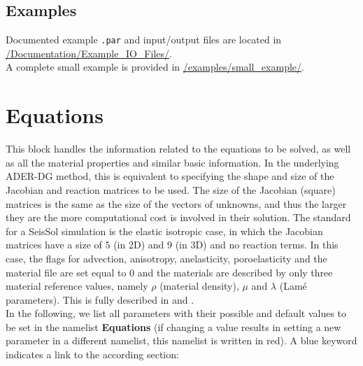 \documentclass[12pt,twoside]{article}
\begin{document}
\subsection{Examples}

Documented example {\tt*.par} and input/output files are located in \url{/Documentation/Example_IO_Files/}.\\

\noindent A complete small example is provided in \url{/examples/small_example/}.


\section{Equations}
\label{sec-block-eqs}
This block handles the information related to the equations to be solved,
as well as all the material properties and similar basic information.
In the underlying ADER-DG method,
this is equivalent to specifying the shape and size of the Jacobian and reaction matrices to be used.
The size of the Jacobian (square) matrices is the same as the size of the vectors of unknowns,
and thus the larger they are the more computational cost is involved in their solution.
The standard for a SeisSol simulation is the elastic isotropic case, in which the Jacobian matrices have a size of $5$ (in 2D)
and $9$ (in 3D) and no reaction terms.
In this case, the flags for advection, anisotropy, anelasticity, poroelasticity
and the material file are set equal to 0 and the materials are described by only three material reference values,
namely $\rho$ (material density), $\mu$ and $\lambda$ (Lam{\' e} parameters).
This is fully described in \cite{KaeserDumbser06} and \cite{DumbserKaeser06}.\\

In the following, we list all parameters with their possible and default values to be set in the namelist \textbf{Equations}
(if changing a value results in setting a new parameter in a different namelist, this namelist is written in red).
A blue keyword indicates a link to the according section:\\

\newpage
\end{document}
